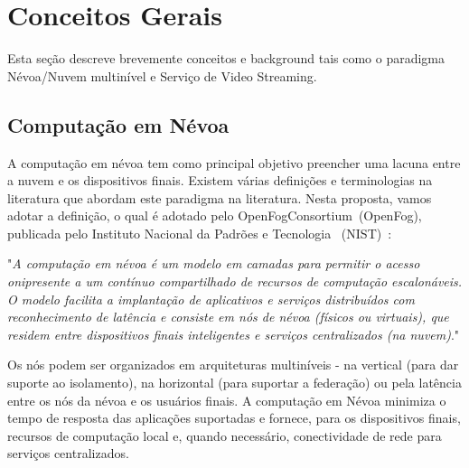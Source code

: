 \clearpage
\section{Conceitos Gerais}
\label{ch:background}

Esta seção descreve brevemente conceitos e background tais como o paradigma Névoa/Nuvem multinível e Serviço de Video Streaming.

\subsection{Computação em Névoa}

A computação em névoa tem como principal objetivo preencher uma lacuna entre a nuvem e os dispositivos finais. Existem várias definições e terminologias na literatura que abordam este paradigma na literatura. Nesta proposta, vamos adotar a definição, o qual é adotado pelo OpenFogConsortium~(OpenFog), publicada pelo Instituto Nacional da Padrões e Tecnologia%
~(NIST)~\cite{NIST2018-FogComputingConceptualModel}: 

\begin{displayquote}

"\textit{A computação em névoa é um modelo em camadas para permitir o acesso onipresente a um contínuo compartilhado de recursos de computação escalonáveis. O modelo facilita a implantação de aplicativos e serviços distribuídos com reconhecimento de latência e consiste em nós de névoa (físicos ou virtuais), que residem entre dispositivos finais inteligentes e serviços centralizados (na nuvem)}."

\end{displayquote}

Os nós podem ser organizados em arquiteturas multiníveis - na vertical (para dar suporte ao isolamento), na horizontal (para suportar a federação) ou pela latência entre os nós da névoa e os usuários finais. A computação em Névoa minimiza o tempo de resposta das aplicações suportadas e fornece, para os dispositivos finais, recursos de computação local e, quando necessário, conectividade de rede para serviços centralizados. %

